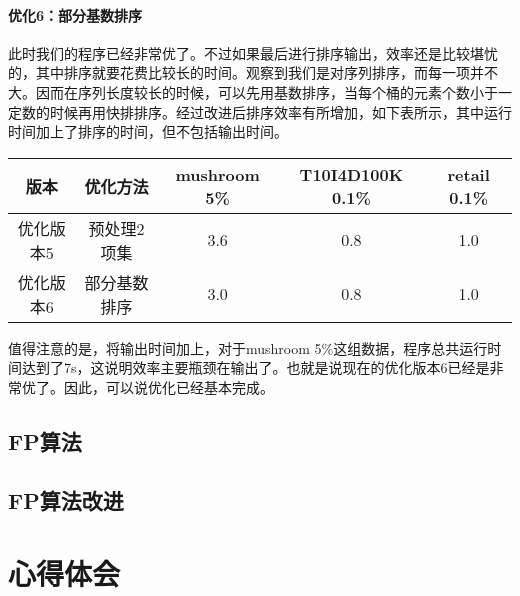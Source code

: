 \documentclass[a4paper,9pt]{article}
\begin{document}
\paragraph{优化6：部分基数排序} 此时我们的程序已经非常优了。不过如果最后进行排序输出，效率还是比较堪忧的，其中排序就要花费比较长的时间。观察到我们是对序列排序，而每一项并不大。因而在序列长度较长的时候，可以先用基数排序，当每个桶的元素个数小于一定数的时候再用快排排序。经过改进后排序效率有所增加，如下表所示，其中运行时间加上了排序的时间，但不包括输出时间。
\begin{center}
	\begin{tabular}{ccccc}
		版本&优化方法&mushroom 5\%&T10I4D100K 0.1\%&retail 0.1\%\\\hline
		优化版本5&预处理2项集&3.6&0.8&1.0\\
		优化版本6&部分基数排序&3.0&0.8&1.0
	\end{tabular}
\end{center}
值得注意的是，将输出时间加上，对于mushroom 5\%这组数据，程序总共运行时间达到了7s，这说明效率主要瓶颈在输出了。也就是说现在的优化版本6已经是非常优了。因此，可以说优化已经基本完成。

\subsection{FP算法}

\subsection{FP算法改进}

\section{心得体会}
\end{document}
